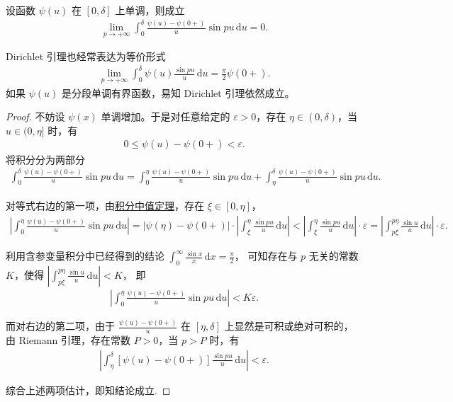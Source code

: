 \documentclass[../../main.tex]{subfiles}%
\begin{document}
\begin{theorem}[Dirichlet引理]\label{theorem:Dirichlet引理}
设函数 $\psi(u)$ 在 $[0,\delta]$ 上单调，则成立
\begin{align*}
\lim_{p \to +\infty} \int_0^\delta \frac{\psi(u) - \psi(0+)}{u} \sin p u \,\mathrm{d}u = 0.
\end{align*}
\end{theorem}
\begin{remark}
Dirichlet 引理也经常表达为等价形式
\begin{align*}
\lim_{p \to +\infty} \int_{0}^{\delta} \psi(u) \frac{\sin p u}{u} \,\mathrm{d}u = \frac{\pi}{2} \psi(0+).
\end{align*}
如果 $\psi(u)$ 是分段单调有界函数，易知 Dirichlet 引理依然成立。
\end{remark}
\begin{proof}

不妨设 $\psi(x)$ 单调增加。于是对任意给定的 $\varepsilon > 0$，存在 $\eta \in (0, \delta)$，当 $u \in (0, \eta]$ 时，有
\begin{align*}
0 \leqslant \psi(u) - \psi(0+) < \varepsilon.
\end{align*}
将积分分为两部分
\begin{align*}
\int_{0}^{\delta} \frac{\psi(u) - \psi(0+)}{u} \sin p u \,\mathrm{d}u
= \int_{0}^{\eta} \frac{\psi(u) - \psi(0+)}{u} \sin p u \,\mathrm{d}u + \int_{\eta}^{\delta} \frac{\psi(u) - \psi(0+)}{u} \sin p u \,\mathrm{d}u.
\end{align*}

对等式右边的第一项，由\hyperref[theorem:积分中值定理]{积分中值定理}，存在 $\xi \in [0, \eta]$，
\begin{align*}
\left| \int_{0}^{\eta} \frac{\psi(u) - \psi(0+)}{u} \sin p u \,\mathrm{d}u \right|
= \left| \psi(\eta) - \psi(0+) \right| \cdot \left| \int_{\xi}^{\eta} \frac{\sin p u}{u} \,\mathrm{d}u \right| 
< \left| \int_{\xi}^{\eta} \frac{\sin p u}{u} \,\mathrm{d}u \right| \cdot \varepsilon = \left| \int_{p\xi}^{p\eta} \frac{\sin u}{u} \,\mathrm{d}u \right| \cdot \varepsilon.
\end{align*}

利用含参变量积分中已经得到的结论
$\int_{0}^{\infty} \frac{\sin x}{x} \,\mathrm{d}x = \frac{\pi}{2}$，
可知存在与 $p$ 无关的常数 $K$，使得
$\left| \int_{p\xi}^{p\eta} \frac{\sin u}{u} \,\mathrm{d}u \right| < K$，
即
\begin{align*}
\left| \int_{0}^{\eta} \frac{\psi(u) - \psi(0+)}{u} \sin p u \,\mathrm{d}u \right| < K\varepsilon.
\end{align*}

而对右边的第二项，由于
$\frac{\psi(u) - \psi(0+)}{u}$
在 $[\eta, \delta]$ 上显然是可积或绝对可积的，由 Riemann 引理，存在常数 $P > 0$，当 $p > P$ 时，有
\begin{align*}
\left| \int_{\eta}^{\delta} [\psi(u) - \psi(0+)] \frac{\sin p u}{u} \,\mathrm{d}u \right| < \varepsilon.
\end{align*}

综合上述两项估计，即知结论成立.
\end{proof}
\end{document}
